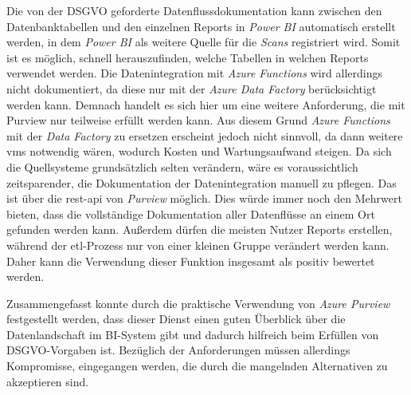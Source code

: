 Die von der DSGVO geforderte Datenflussdokumentation kann zwischen den Datenbanktabellen und den einzelnen Reports in \textit{Power BI} automatisch erstellt werden, in dem \textit{Power BI} als weitere Quelle für die \textit{Scans} registriert wird. Somit ist es möglich, schnell herauszufinden, welche Tabellen in welchen Reports verwendet werden. Die Datenintegration mit \textit{Azure Functions} wird allerdings nicht dokumentiert, da diese nur mit der \textit{Azure Data Factory} berücksichtigt werden kann. Demnach handelt es sich hier um eine weitere Anforderung, die mit Purview nur teilweise erfüllt werden kann. Aus diesem Grund \textit{Azure Functions} mit der \textit{Data Factory} zu ersetzen erscheint jedoch nicht sinnvoll, da dann weitere \acp{vm} notwendig wären, wodurch Kosten und Wartungsaufwand steigen. Da sich die Quellsysteme grundsätzlich selten verändern, wäre es voraussichtlich zeitsparender, die Dokumentation der Datenintegration manuell zu pflegen. Das ist über die \ac{rest}-\ac{api} von \textit{Purview} möglich. Dies würde immer noch den Mehrwert bieten, dass die vollständige Dokumentation aller Datenflüsse an einem Ort gefunden werden kann. Außerdem dürfen die meisten Nutzer Reports erstellen, während der \ac{etl}-Prozess nur von einer kleinen Gruppe verändert werden kann. Daher kann die Verwendung dieser Funktion insgesamt als positiv bewertet werden. \cite[vgl.][]{lesteve_definitive_2021, msdoc_22_purview_sensLabel, riscutia_data_2021, borosch_cloud_2021}

Zusammengefasst konnte durch die praktische Verwendung von \textit{Azure Purview} festgestellt werden, dass dieser Dienst einen guten Überblick über die Datenlandschaft im BI-System gibt und dadurch hilfreich beim Erfüllen von DSGVO-Vorgaben ist. Bezüglich der Anforderungen müssen allerdings Kompromisse, eingegangen werden, die durch die mangelnden Alternativen zu akzeptieren sind.